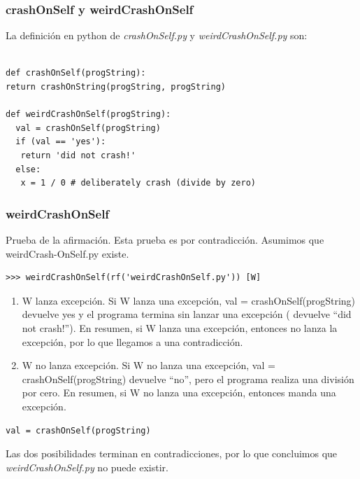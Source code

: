 \documentclass[xcolor=table]{beamer}
\begin{document}
\begin{frame} [fragile]\frametitle{crashOnSelf y weirdCrashOnSelf}   \footnotesize  

La definición en python de \textit{crashOnSelf.py} y  \textit{weirdCrashOnSelf.py} son:

  \begin{verbatim}

def crashOnSelf(progString):
return crashOnString(progString, progString)

def weirdCrashOnSelf(progString):
  val = crashOnSelf(progString)
  if (val == 'yes'):
   return 'did not crash!'
  else:
   x = 1 / 0 # deliberately crash (divide by zero)

\end{verbatim}    



\end{frame} 
\begin{frame} [fragile] \frametitle{weirdCrashOnSelf}  \footnotesize  

Prueba de la afirmación. Esta prueba es por contradicción. Asumimos que  weirdCrash-OnSelf.py existe. 

\begin{verbatim}
>>> weirdCrashOnSelf(rf('weirdCrashOnSelf.py')) [W]
\end{verbatim}    

\begin{enumerate}
    \item W lanza excepción. Si  W lanza una excepción, val = crashOnSelf(progString) devuelve yes y el programa termina sin lanzar una excepción ( devuelve  ``did not crash!”). En resumen, si W lanza una excepción, entonces no lanza la excepción, por lo que llegamos a una contradicción. 

    \item  W no lanza excepción. Si W no lanza una excepción, val = crashOnSelf(progString) devuelve ``no'', pero el programa realiza una división por cero. En resumen, si W no lanza una excepción, entonces manda una excepción.
\end{enumerate}

\begin{center}
\begin{verbatim}
val = crashOnSelf(progString)
\end{verbatim}    
\end{center}

Las dos posibilidades terminan en contradicciones, por lo que concluimos que \large \textit{weirdCrashOnSelf.py} no puede existir. 

\end{frame} 
\end{document}
